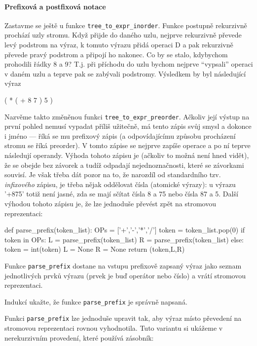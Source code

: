 \paragraph{Prefixová a postfixová notace} Zastavme se ještě u funkce
{\tt tree\_to\_expr\_inorder}. Funkce postupně rekurzivně prochází uzly stromu.
Když přijde do daného uzlu, nejprve rekurzivně převede levý podstrom na výraz,
k tomuto výrazu přidá operaci D a pak rekurzivně převede pravý podstrom a připojí
ho nakonec. Co by se stalo, kdybychom prohodili řádky 8 a 9?  T.j. při příchodu
do uzlu bychom nejprve ``vypsali'' operaci v daném uzlu a teprve pak se zabývali
podstromy. Výsledkem by byl následující výraz
\begin{center}
 ( * ( + 8 7 ) 5 )
\end{center}
Nazvěme takto změněnou funkci {\tt tree\_to\_expr\_preorder}. Ačkoliv její výstup
na první pohled nemusí vypadat příliš užitečně, má tento zápis
svůj smysl a dokonce i jméno --- říká se mu prefixový zápis (a odpovídajícímu
způsobu procházení stromu se říká preorder). V tomto zápise se nejprve zapíše
operace a po ní teprve následují operandy. Výhoda tohoto zápisu je (ačkoliv to možná
není hned vidět), že se obejde bez závorek a tudíž odpadají nejednoznačnosti,
které se závorkami souvisí. Je však třeba dát pozor na to, že narozdíl od
standardního tzv. \emph{infixového} zápisu, je třeba nějak oddělovat čísla
(atomické výrazy): u výrazu '+875' totiž není jasné, zda se mají
sčítat čísla 8 a 75 nebo čísla 87 a 5. Další výhodou tohoto zápisu je, že lze
jednoduše převést zpět na stromovou reprezentaci:

\begin{python}
def parse_prefix(token_list):
    OPs = ['+','-','*','/']
    token = token_list.pop(0)
    if token in OPs:
        L = parse_prefix(token_list)
        R = parse_prefix(token_list)
    else:
        token = int(token)
        L = None
        R = None
    return (token,L,R)
\end{python}

Funkce {\tt parse\_prefix} dostane na vstupu prefixově zapsaný výraz jako
seznam jednotlivých prvků výrazu (prvek je buď operátor nebo číslo) a vrátí
stromovou reprezentaci.

\begin{cviceni} Indukcí ukažte, že funkce {\tt parse\_prefix} je správně napsaná.
\end{cviceni}

Funkci {\tt parse\_prefix} lze jednoduše upravit tak, aby výraz místo převedení
na stromovou reprezentaci rovnou vyhodnotila. Tuto variantu si ukážeme v
nerekurzivním provedení, které používá zásobník:

